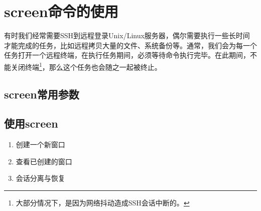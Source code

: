 \section{screen命令的使用}
\label{sec:screenCmd}

有时我们经常需要SSH到远程登录Unix/Linux服务器，偶尔需要执行一些长时间
才能完成的任务，比如远程拷贝大量的文件、系统备份等。通常，我们会为每一个任务打开一个远程终端，在执行任务期间，必须等待命令执行完毕。在此期间，不能关闭终端\footnote{大部分情况下，是因为网络抖动造成SSH会话中断的。}，那么这个任务也会随之一起被终止。

\subsection{screen常用参数}

\subsection{使用screen}

\begin{enumerate}
\item 创建一个新窗口
\item 查看已创建的窗口
\item 会话分离与恢复
\end{enumerate}
